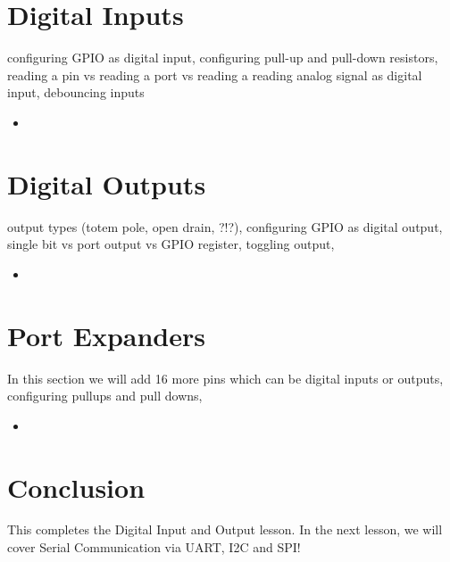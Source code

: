 \documentclass{article}
\begin{document}
\section*{Digital Inputs}
configuring GPIO as digital input, configuring pull-up and pull-down 
resistors, reading a pin vs reading a port vs reading a  reading analog signal as digital input, debouncing inputs

\begin{itemize}
  \item 

\end{itemize}
\vspace{3mm}



\section*{Digital Outputs}

output types (totem pole, open drain, ?!?), configuring GPIO as digital output, 
single bit vs port output vs GPIO register, toggling output,

\begin{itemize}
  \item 

\end{itemize}
\vspace{3mm}



\section*{Port Expanders}
In this section we will add 16 more pins which can be digital inputs or 
outputs, configuring pullups and pull downs, 
\begin{itemize}
  \item 

\end{itemize}
\vspace{3mm}



\section*{Conclusion}
This completes the Digital Input and Output lesson.  In the next lesson, 
we will cover Serial Communication via UART, I2C and SPI!
\end{document}
